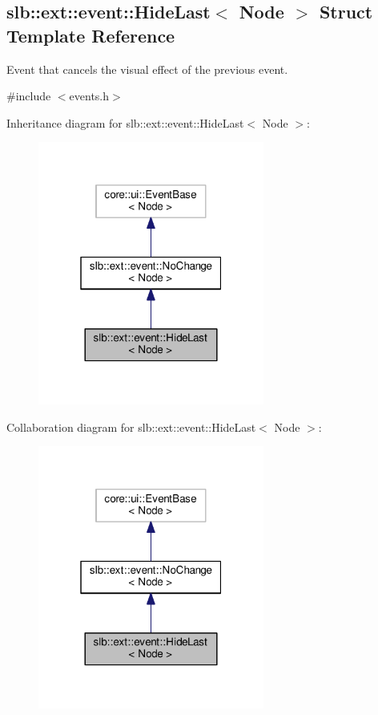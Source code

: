 \hypertarget{structslb_1_1ext_1_1event_1_1HideLast}{}\subsection{slb\+:\+:ext\+:\+:event\+:\+:Hide\+Last$<$ Node $>$ Struct Template Reference}
\label{structslb_1_1ext_1_1event_1_1HideLast}


Event that cancels the visual effect of the previous event.  




{\ttfamily \#include $<$events.\+h$>$}



Inheritance diagram for slb\+:\+:ext\+:\+:event\+:\+:Hide\+Last$<$ Node $>$\+:\nopagebreak
\begin{figure}[H]
\begin{center}
\leavevmode
\includegraphics[width=211pt]{structslb_1_1ext_1_1event_1_1HideLast__inherit__graph}
\end{center}
\end{figure}


Collaboration diagram for slb\+:\+:ext\+:\+:event\+:\+:Hide\+Last$<$ Node $>$\+:\nopagebreak
\begin{figure}[H]
\begin{center}
\leavevmode
\includegraphics[width=211pt]{structslb_1_1ext_1_1event_1_1HideLast__coll__graph}
\end{center}
\end{figure}
